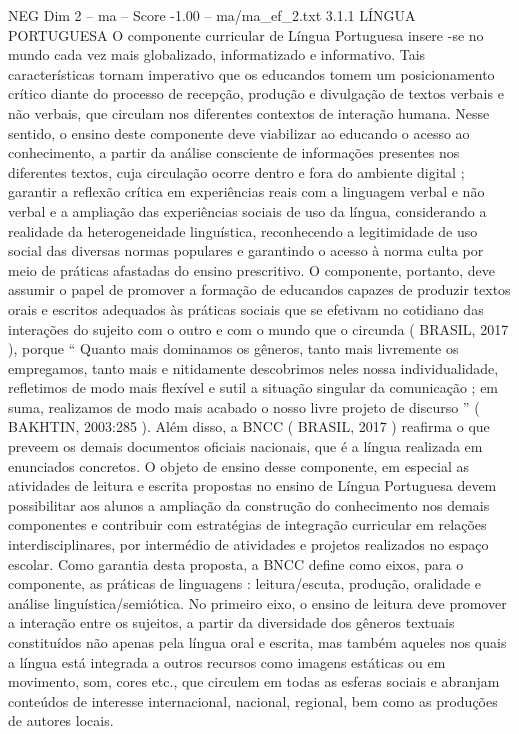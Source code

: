 \begin{textsample}{NEG Dim 2 – ma – Score -1.00 – ma/ma\_ef\_2.txt}  \label{ex:f2_neg_232}
3.1.1 LÍNGUA PORTUGUESA O componente curricular de Língua Portuguesa insere -se no mundo cada vez mais globalizado, informatizado e informativo.
Tais características tornam imperativo que os educandos tomem um posicionamento crítico diante do processo de recepção, produção e divulgação de textos verbais e não verbais, que circulam nos diferentes contextos de interação humana.
Nesse sentido, o ensino deste componente deve viabilizar ao educando o acesso ao conhecimento, a partir da análise consciente de informações presentes nos diferentes textos, cuja circulação ocorre dentro e fora do ambiente digital ; garantir a reflexão crítica em experiências reais com a linguagem verbal e não verbal e a ampliação das experiências sociais de uso da língua, considerando a realidade da heterogeneidade linguística, reconhecendo a legitimidade de uso social das diversas normas populares e garantindo o acesso à norma culta por meio de práticas afastadas do ensino prescritivo.
O componente, portanto, deve assumir o papel de promover a formação de educandos capazes de produzir textos orais e escritos adequados às práticas sociais que se efetivam no cotidiano das interações do sujeito com o outro e com o mundo que o circunda ( BRASIL, 2017 ), porque “ Quanto mais dominamos os gêneros, tanto mais livremente os empregamos, tanto mais e nitidamente descobrimos neles nossa individualidade, refletimos de modo mais flexível e sutil a situação singular da comunicação ; em suma, realizamos de modo mais acabado o nosso livre projeto de discurso ” ( BAKHTIN, 2003:285 ).
Além disso, a BNCC ( BRASIL, 2017 ) reafirma o que preveem os demais documentos oficiais nacionais, que é a língua realizada em enunciados concretos.
O objeto de ensino desse componente, em especial as atividades de leitura e escrita propostas no ensino de Língua Portuguesa devem possibilitar aos alunos a ampliação da construção do conhecimento nos demais componentes e contribuir com estratégias de integração curricular em relações interdisciplinares, por intermédio de atividades e projetos realizados no espaço escolar.
Como garantia desta proposta, a BNCC define como eixos, para o componente, as práticas de linguagens : leitura/escuta, produção, oralidade e análise linguística/semiótica.
No primeiro eixo, o ensino de leitura deve promover a interação entre os sujeitos, a partir da diversidade dos gêneros textuais constituídos não apenas pela língua oral e escrita, mas também aqueles nos quais a língua está integrada a outros recursos como imagens estáticas ou em movimento, som, cores etc., que circulem em todas as esferas sociais e abranjam conteúdos de interesse internacional, nacional, regional, bem como as produções de autores locais.

\end{textsample}
